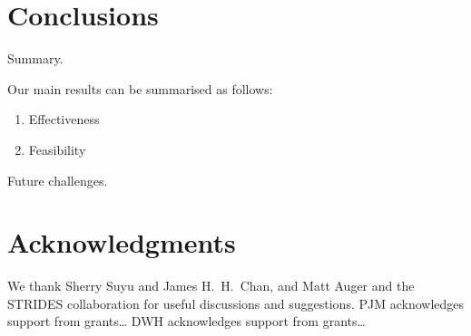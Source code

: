 \documentclass[useAMS,usenatbib]{mn2e}
\begin{document}

\section{Conclusions}
\label{sec:concl}

Summary.

Our main results can be summarised as follows:

\begin{enumerate}

\item Effectiveness

\item Feasibility

\end{enumerate}

Future challenges.


\section*{Acknowledgments}
 
We thank Sherry Suyu and James H.\ H.\ Chan, and Matt Auger and the STRIDES
collaboration for useful discussions and suggestions.
PJM acknowledges support from grants\ldots
DWH acknowledges support from grants\ldots











\label{lastpage}
\bsp
\end{document}
